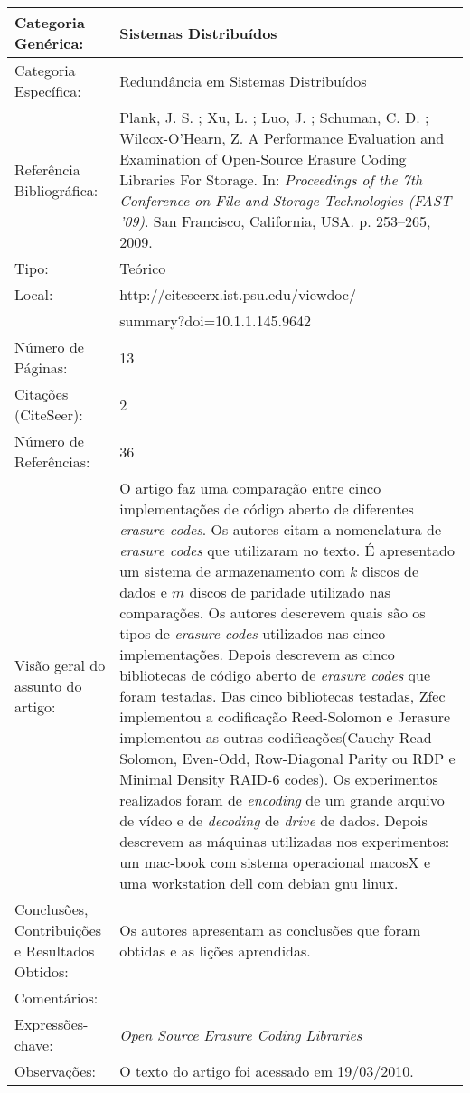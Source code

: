 \documentclass[10pt,a4paper]{article}
\begin{document}
\begin{center}
\begin{tabular}{|p{5cm}||p{10cm}|}
\end{tabular}
\end{center}

\begin{center}
\begin{tabular}{|p{5cm}||p{10cm}|}
\hline
Categoria Genérica: & Sistemas Distribuídos\\\hline
Categoria Específica: &  Redundância em Sistemas Distribuídos\\\hline
Referência Bibliográfica: & Plank, J. S. ; Xu, L. ; Luo, J. ; Schuman, C. D. ; Wilcox-O'Hearn, Z. A Performance Evaluation and Examination of Open-Source Erasure Coding Libraries For Storage. In:  \emph{Proceedings of the 7th Conference on File and Storage Technologies (FAST '09)}. San Francisco, California, USA. p. 253--265, 2009.\\\hline
Tipo: & Teórico\\\hline
Local: & http://citeseerx.ist.psu.edu/viewdoc/\\ & summary?doi=10.1.1.145.9642\\\hline
Número de Páginas: & 13\\\hline
Citações (CiteSeer): & 2\\\hline
Número de Referências: & 36\\\hline
Visão geral do assunto do artigo: & O artigo faz uma comparação entre cinco implementações de código aberto de diferentes \emph{erasure codes}. Os autores citam a nomenclatura de \emph{erasure codes} que utilizaram no texto. É apresentado um sistema de armazenamento com $k$ discos de dados e $m$ discos de paridade utilizado nas comparações. Os autores descrevem quais são os tipos de \emph{erasure codes} utilizados nas cinco implementações. Depois descrevem as cinco bibliotecas de código aberto de \emph{erasure codes} que foram testadas. Das cinco bibliotecas testadas, Zfec implementou a codificação Reed-Solomon e Jerasure implementou as outras codificações(Cauchy Read-Solomon, Even-Odd, Row-Diagonal Parity ou RDP e Minimal Density RAID-6 codes). Os experimentos realizados foram de \emph{encoding} de um grande arquivo de vídeo e de \emph{decoding} de \emph{drive} de dados. Depois descrevem as máquinas utilizadas nos experimentos: um mac-book com sistema operacional macosX e uma workstation dell com debian gnu linux.\\\hline
Conclusões, Contribuições e Resultados Obtidos: & Os autores apresentam as conclusões que foram obtidas e as lições aprendidas.\\\hline
Comentários: & \\\hline
Expressões-chave: & \emph{Open Source Erasure Coding Libraries}\\\hline
Observações: & O texto do artigo foi acessado em 19/03/2010.\\\hline

\end{tabular}
\end{center}
\end{document}
